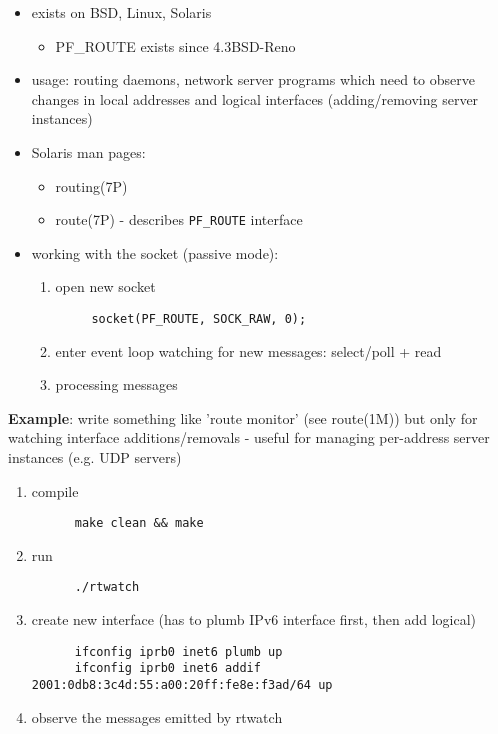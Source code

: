 \begin{itemize}
\item exists on BSD, Linux, Solaris
  \begin{itemize}
    \item PF\_ROUTE exists since 4.3BSD-Reno
  \end{itemize}
  \item usage: routing daemons, network server programs which need to observe
        changes in local addresses and logical interfaces (adding/removing
        server instances)
\end{itemize}


\begin{itemize}
  \item Solaris man pages:
  \begin{itemize}
    \item routing(7P)
    \item route(7P) - describes \texttt{PF\_ROUTE} interface
  \end{itemize}
  \item working with the socket (passive mode):
\begin{enumerate}
  \item open new socket
\begin{verbatim}
     socket(PF_ROUTE, SOCK_RAW, 0);
\end{verbatim}
  \item enter event loop watching for new messages: select/poll + read
  \item processing messages
\end{enumerate}
\end{itemize}

{\bf Example}: write something like 'route monitor' (see route(1M)) but only
    for watching interface additions/removals
     - useful for managing per-address server instances (e.g. UDP servers)
\begin{enumerate}
  \item compile
\begin{verbatim}
      make clean && make
\end{verbatim}
  \item run
\begin{verbatim}
      ./rtwatch
\end{verbatim}
  \item create new interface (has to plumb IPv6 interface first, then add logical)
\begin{verbatim}
      ifconfig iprb0 inet6 plumb up
      ifconfig iprb0 inet6 addif 2001:0db8:3c4d:55:a00:20ff:fe8e:f3ad/64 up
\end{verbatim}
  \item observe the messages emitted by rtwatch
\end{enumerate}


